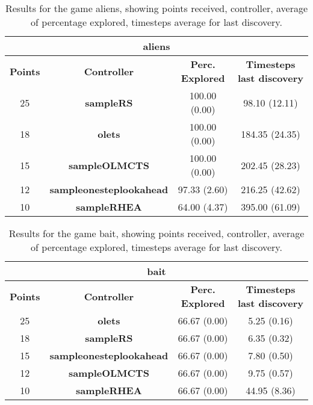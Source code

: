 \begin{table*}[!t]
\begin{center}
\begin{tabular}{|c|c|c|c|}
\multicolumn{4}{c}{\textbf{aliens}}\\
\hline
\textbf{Points} & \textbf{Controller} & \textbf{Perc. Explored} &  \textbf{Timesteps last discovery}\\
\hline
25 & \textbf{sampleRS} & 100.00 (0.00) & 98.10 (12.11)
 \\
\hline
18 & \textbf{olets} & 100.00 (0.00) & 184.35 (24.35)
 \\
\hline
15 & \textbf{sampleOLMCTS} & 100.00 (0.00) & 202.45 (28.23)
 \\
\hline
12 & \textbf{sampleonesteplookahead} & 97.33 (2.60) & 216.25 (42.62)
 \\
\hline
10 & \textbf{sampleRHEA} & 64.00 (4.37) & 395.00 (61.09)
 \\
\hline
\end{tabular}
\caption{Results for the game aliens, showing points received, controller, average of percentage explored, timesteps average for last discovery.}
\label{tab:weights}
\end{center}
\end{table*}
\begin{table*}[!t]
\begin{center}
\begin{tabular}{|c|c|c|c|}
\multicolumn{4}{c}{\textbf{bait}}\\
\hline
\textbf{Points} & \textbf{Controller} & \textbf{Perc. Explored} &  \textbf{Timesteps last discovery}\\
\hline
25 & \textbf{olets} & 66.67 (0.00) & 5.25 (0.16)
 \\
\hline
18 & \textbf{sampleRS} & 66.67 (0.00) & 6.35 (0.32)
 \\
\hline
15 & \textbf{sampleonesteplookahead} & 66.67 (0.00) & 7.80 (0.50)
 \\
\hline
12 & \textbf{sampleOLMCTS} & 66.67 (0.00) & 9.75 (0.57)
 \\
\hline
10 & \textbf{sampleRHEA} & 66.67 (0.00) & 44.95 (8.36)
 \\
\hline
\end{tabular}
\caption{Results for the game bait, showing points received, controller, average of percentage explored, timesteps average for last discovery.}
\label{tab:weights}
\end{center}
\end{table*}
